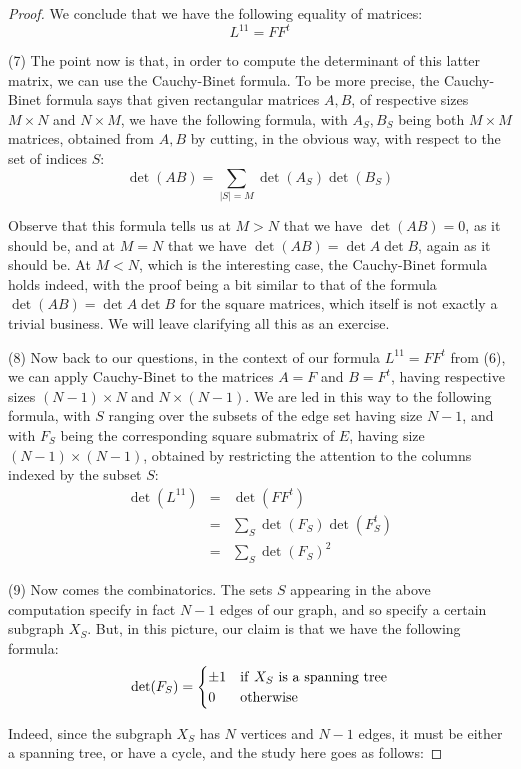 \documentclass[12pt]{amsbook}
\begin{document}
\begin{proof}
We conclude that we have the following equality of matrices:
$$L^{11}=FF^t$$

(7) The point now is that, in order to compute the determinant of this latter matrix, we can use the Cauchy-Binet formula. To be more precise, the Cauchy-Binet formula says that given rectangular matrices $A,B$, of respective sizes $M\times N$ and $N\times M$, we have the following formula, with $A_S,B_S$ being both $M\times M$ matrices, obtained from $A,B$ by cutting, in the obvious way, with respect to the set of indices $S$:
$$\det(AB)=\sum_{|S|=M}\det(A_S)\det(B_S)$$

Observe that this formula tells us at $M>N$ that we have $\det(AB)=0$, as it should be, and at $M=N$ that we have $\det(AB)=\det A\det B$, again as it should be. At $M<N$, which is the interesting case, the Cauchy-Binet formula holds indeed, with the proof being a bit similar to that of the formula $\det(AB)=\det A\det B$ for the square matrices, which itself is not exactly a trivial business. We will leave clarifying all this as an exercise.

\medskip

(8) Now back to our questions, in the context of our formula $L^{11}=FF^t$ from (6), we can apply Cauchy-Binet to the matrices $A=F$ and $B=F^t$, having respective sizes $(N-1)\times N$ and $N\times(N-1)$. We are led in this way to the following formula, with $S$ ranging over the subsets of the edge set having size $N-1$, and with $F_S$ being the corresponding square submatrix of $E$, having size $(N-1)\times(N-1)$, obtained by restricting the attention to the columns indexed by the subset $S$:
\begin{eqnarray*}
\det(L^{11})
&=&\det(FF^t)\\
&=&\sum_S\det(F_S)\det(F_S^t)\\
&=&\sum_S\det(F_S)^2
\end{eqnarray*}

(9) Now comes the combinatorics. The sets $S$ appearing in the above computation specify in fact $N-1$ edges of our graph, and so specify a certain subgraph $X_S$. But, in this picture, our claim is that we have the following formula:
$$\det(F_S)=\begin{cases}
\pm1&{\rm if}\ X_S\ {\rm is\ a\ spanning\ tree}\\
0&{\rm otherwise}
\end{cases}$$

Indeed, since the subgraph $X_S$ has $N$ vertices and $N-1$ edges, it must be either a spanning tree, or have a cycle, and the study here goes as follows:


\end{proof}
\end{document}
